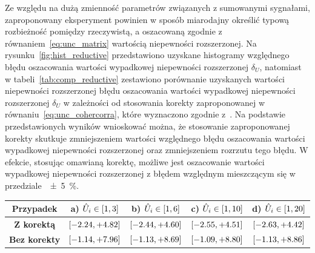Ze względu na dużą zmienność parametrów związanych z sumowanymi sygnałami, zaproponowany eksperyment powinien w sposób miarodajny określić typową rozbieżność pomiędzy rzeczywistą, a oszacowaną zgodnie z równaniem~\eqref{eq:unc_matrix} wartością niepewności rozszerzonej. Na rysunku~\ref{fig:hist_reductive} przedstawiono uzyskane histogramy względnego błędu oszacowania wartości wypadkowej niepewności rozszerzonej $\delta_{U}$, natomiast w tabeli~\ref{tab:comp_reductive} zestawiono porównanie uzyskanych wartości niepewności rozszerzonej błędu oszacowania wartości wypadkowej niepewności rozszerzonej $\delta_{U}$ w zależności od stosowania korekty zaproponowanej w równaniu~\eqref{eq:unc_cohercorra}, które wyznaczono zgodnie z~\cite{jcgm_guide, jcgm_montecarlo}. Na podstawie przedstawionych wyników wnioskować można, że stosowanie zaproponowanej korekty skutkuje zmniejszeniem wartości względnego błędu oszacowania wartości wypadkowej niepewności rozszerzonej oraz zmniejszeniem rozrzutu tego błędu. W efekcie, stosując omawianą korektę, możliwe jest oszacowanie wartości wypadkowej niepewności rozszerzonej z błędem względnym mieszczącym się w przedziale~\qty{\pm 5}{\percent}.

\begin{table}[htb!]
\begin{center}
\begin{tabular}[c]{| c | c | c | c | c |} \hline
\textbf{Przypadek}   & \textbf{a) $\hat{U}_{i} \in \interval{1}{3}$} & \textbf{b) $\hat{U}_{i} \in \interval{1}{6}$} & \textbf{c) $\hat{U}_{i} \in \interval{1}{10}$} & \textbf{d) $\hat{U}_{i} \in \interval{1}{20}$} \\ \hline
\textbf{Z korektą}   & $\interval{-2.24}{+4.82}$ & $\interval{-2.44}{+4.60}$ & $\interval{-2.55}{+4.51}$ & $\interval{-2.63}{+4.42}$ \\ \hline
\textbf{Bez korekty} & $\interval{-1.14}{+7.96}$ & $\interval{-1.13}{+8.69}$ & $\interval{-1.09}{+8.80}$ & $\interval{-1.13}{+8.86}$ \\ \hline
\end{tabular}
\end{center}
\end{table}

